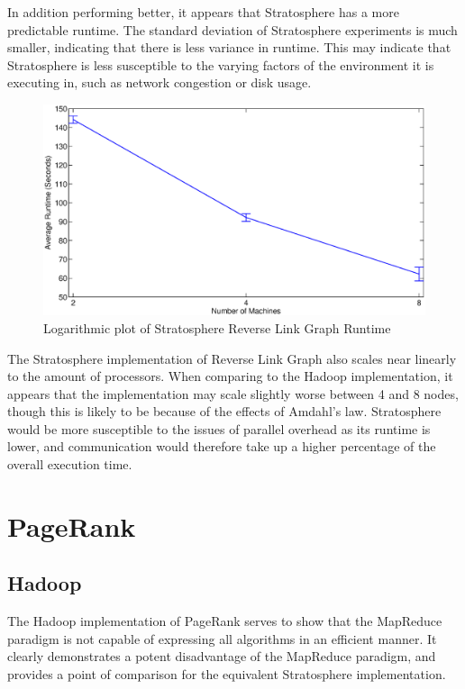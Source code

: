 In addition performing better, it appears that Stratosphere has a more predictable runtime. The standard deviation of Stratosphere experiments is much smaller, indicating that there is less variance in runtime. This may indicate that Stratosphere is less susceptible to the varying factors of the environment it is executing in, such as network congestion or disk usage.  

\begin{figure}[H]
	\centering
	\includegraphics[scale=0.6]{resources/StratRLGScalability.eps}
	\caption{Logarithmic plot of Stratosphere Reverse Link Graph Runtime}
	\label{hadoopvstratRLGRuntime}
\end{figure}

The Stratosphere implementation of Reverse Link Graph also scales near linearly to the amount of processors. When comparing to the Hadoop implementation, it appears that the implementation may scale slightly worse between 4 and 8 nodes, though this is likely to be because of the effects of Amdahl's law. Stratosphere would be more susceptible to the issues of parallel overhead as its runtime is lower, and communication would therefore take up a higher percentage of the overall execution time. 

\section{PageRank}

\subsection{Hadoop}
The Hadoop implementation of PageRank serves to show that the MapReduce paradigm is not capable of expressing all algorithms in an efficient manner. It clearly demonstrates a potent disadvantage of the MapReduce paradigm, and provides a point of comparison for the equivalent Stratosphere implementation.

